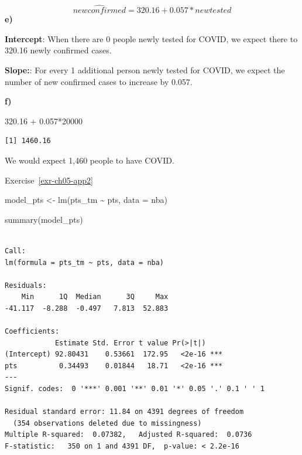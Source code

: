 \documentclass[
  letterpaper,
  DIV=11,
  numbers=noendperiod]{scrreprt}
\newenvironment{Shaded}{\begin{snugshade}}{\end{snugshade}}
\newcommand{\AttributeTok}[1]{\textcolor[rgb]{0.40,0.45,0.13}{#1}}
\newcommand{\DecValTok}[1]{\textcolor[rgb]{0.68,0.00,0.00}{#1}}
\newcommand{\FloatTok}[1]{\textcolor[rgb]{0.68,0.00,0.00}{#1}}
\newcommand{\FunctionTok}[1]{\textcolor[rgb]{0.28,0.35,0.67}{#1}}
\newcommand{\NormalTok}[1]{\textcolor[rgb]{0.00,0.23,0.31}{#1}}
\newcommand{\OtherTok}[1]{\textcolor[rgb]{0.00,0.23,0.31}{#1}}
\newcommand{\SpecialCharTok}[1]{\textcolor[rgb]{0.37,0.37,0.37}{#1}}
\theoremstyle{definition}
\theoremstyle{remark}
\begin{document}
\[\widehat{newconfirmed} = 320.16 + 0.057*newtested\] \textbf{e)}

\textbf{Intercept}: When there are 0 people newly tested for COVID, we
expect there to 320.16 newly confirmed cases.

\textbf{Slope:}: For every 1 additional person newly tested for COVID,
we expect the number of new confirmed cases to increase by 0.057.

\textbf{f)}

\begin{Shaded}
\begin{Highlighting}[]
\FloatTok{320.16} \SpecialCharTok{+} \FloatTok{0.057}\SpecialCharTok{*}\DecValTok{20000}
\end{Highlighting}
\end{Shaded}

\begin{verbatim}
[1] 1460.16
\end{verbatim}

We would expect 1,460 people to have COVID.

Exercise~\ref{exr-ch05-app2}

\begin{Shaded}
\begin{Highlighting}[]
\NormalTok{model\_pts }\OtherTok{\textless{}{-}} \FunctionTok{lm}\NormalTok{(pts\_tm }\SpecialCharTok{\textasciitilde{}}\NormalTok{ pts, }\AttributeTok{data =}\NormalTok{ nba)}

\FunctionTok{summary}\NormalTok{(model\_pts)}
\end{Highlighting}
\end{Shaded}

\begin{verbatim}

Call:
lm(formula = pts_tm ~ pts, data = nba)

Residuals:
    Min      1Q  Median      3Q     Max 
-41.117  -8.288  -0.497   7.813  52.883 

Coefficients:
            Estimate Std. Error t value Pr(>|t|)    
(Intercept) 92.80431    0.53661  172.95   <2e-16 ***
pts          0.34493    0.01844   18.71   <2e-16 ***
---
Signif. codes:  0 '***' 0.001 '**' 0.01 '*' 0.05 '.' 0.1 ' ' 1

Residual standard error: 11.84 on 4391 degrees of freedom
  (354 observations deleted due to missingness)
Multiple R-squared:  0.07382,   Adjusted R-squared:  0.0736 
F-statistic:   350 on 1 and 4391 DF,  p-value: < 2.2e-16
\end{verbatim}
\end{document}

